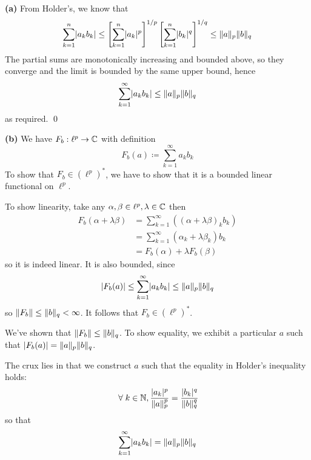 \documentclass[a4paper, 10pt]{article}
\begin{document}
\begin{solution}
    \textbf{(a)} From Holder's, we know that \begin{equation*}
        \sum_{k=1}^{n} \lvert a_k b_k\rvert \leq \left[\sum_{k=1}^{n} \lvert a_k\rvert^p \right]^{1/p}\left[\sum_{k=1}^{n} \lvert b_k\rvert^q \right]^{1/q} \leq \lVert a\rVert_p \lVert b\rVert_q
    \end{equation*}
    The partial sums are monotonically increasing and bounded above, so they converge and the limit is bounded by the same upper bound, hence\begin{equation*}
        \sum_{k=1}^{\infty} \lvert a_k b_k\rvert \leq \lVert a\rVert_p \lVert b\rVert_q
        \end{equation*}
        as required. \qed

    \textbf{(b)} We have $F_b: \ell^p \to \mathbb{C}$ with definition
    \begin{equation*}
        F_b(a) \coloneqq \sum_{k=1}^{\infty} a_k b_k
        \end{equation*}
    To show that $F_b \in (\ell^p)^*$, we have to show that it is a bounded linear functional on $\ell^p$.

    To show linearity, take any $\alpha, \beta \in \ell^p, \lambda \in \mathbb{C}$ then
    \begin{align*}
        F_b(\alpha + \lambda \beta) &= \sum_{k=1}^{\infty} ((\alpha + \lambda \beta)_k b_k) \\
        &= \sum_{k=1}^{\infty} (\alpha_k + \lambda \beta_k) b_k \\
        &= F_b(\alpha) + \lambda F_b(\beta)
    \end{align*}
    so it is indeed linear. It is also bounded, since \begin{align*}
        \lvert F_b(a)\rvert \leq \sum_{k=1}^{\infty} \lvert a_k b_k\rvert \leq \lVert a\rVert_p \lVert b\rVert_q
    \end{align*}
    so $\lVert F_b\rVert \leq \lVert b\rVert_q < \infty$. It follows that $F_b \in (\ell^p)^*$.

    We've shown that $\lVert F_b\rVert \leq \lVert b\rVert_q$. To show equality, we exhibit a particular $a$ such that $\lvert F_b(a)\rvert = \lVert a\rVert_p \lVert b\rVert_q$.

    The crux lies in that we construct $a$ such that the equality in Holder's inequality holds:
    \begin{equation*}
        \forall k \in \bbn, \frac{\abs{a_k}^p}{\norm{a}_p^p} = \frac{\abs{b_k}^q}{\norm{b}_q^q}
    \end{equation*}
    so that \begin{equation*}
        \sum_{k=1}^{\infty} \lvert a_k b_k\rvert = \lVert a\rVert_p \lVert b\rVert_q
    \end{equation*}


\end{solution}
\end{document}
